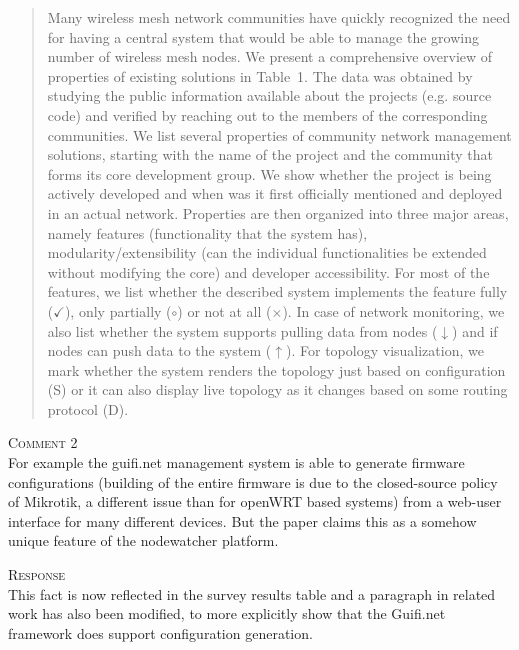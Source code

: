 \documentclass[12pt,twoside,a4paper]{report}
\begin{document}
\begin{quote}

\newcommand{\push}{$\uparrow$}
\newcommand{\pull}{$\downarrow$}

\newcommand{\no}{$\times$}
\newcommand{\yes}{$\checkmark$}
\newcommand{\maybe}{$\circ$}

\newcommand{\static}{S}
\newcommand{\dynamic}{D}

Many wireless mesh network communities have quickly recognized the need for having a central system that would be able to manage the growing number of wireless mesh nodes.
We present a comprehensive overview of properties of existing solutions in Table~1. The data was obtained by studying the public information available about the projects (e.g. source code) and verified by reaching out to the members of the corresponding communities.
We list several properties of community network management solutions, starting with the name of the project and the community that forms its core development group.
We show whether the project is being actively developed and when was it first officially mentioned and deployed in an actual network.
Properties are then organized into three major areas, namely  features (functionality that the system has), modularity/extensibility (can the individual functionalities be extended without modifying the core) and developer accessibility.
For most of the features, we list whether the described system implements the feature fully (\yes), only partially (\maybe) or not at all (\no).
In case of network monitoring, we also list whether the system supports pulling data from nodes (\pull) and if nodes can push data to the system (\push).
For topology visualization, we mark whether the system renders the topology just based on configuration (\static) or it can also display live topology as it changes based on some routing protocol (\dynamic).
\end{quote}

\vspace{0.5cm}\noindent\textsc{Comment 2}\\
For example the guifi.net management system is able to generate firmware configurations (building of the entire firmware is due to the closed-source policy of Mikrotik, a different issue than for openWRT based systems) from a web-user interface for many different devices. But the paper claims this as a somehow unique feature of the nodewatcher platform. 

\vspace{0.5cm}\noindent\textsc{Response}\\
This fact is now reflected in the survey results table and a paragraph in related work has also been modified, to more explicitly show that the Guifi.net framework does support configuration generation.
\end{document}
